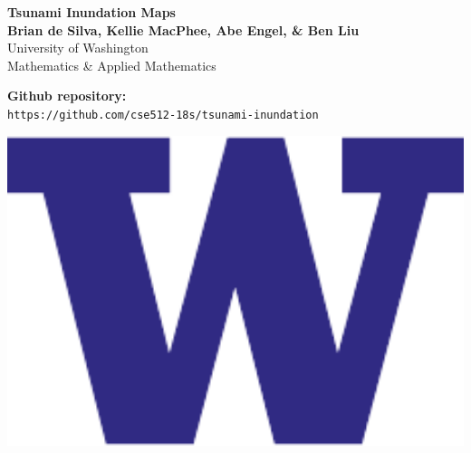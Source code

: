 \documentclass[a0,landscape]{a0poster}
\begin{document}


\begin{minipage}[b]{0.5\linewidth}
\raggedright
\veryHuge \color{MidnightBlue} \textbf{Tsunami Inundation Maps} \color{Black}\\ %
\huge \textbf{Brian de Silva, Kellie MacPhee, Abe Engel, \& Ben Liu}\\ %
\huge University of Washington\\ Mathematics \& Applied Mathematics\\ %
\end{minipage}
%
\begin{minipage}[b]{0.35\linewidth}
\color{DarkRed}\Large \textbf{Github repository:}\\
\texttt{https://github.com/cse512-18s/tsunami-inundation}\\
\end{minipage}
%
\begin{minipage}[b]{0.15\linewidth}
\includegraphics[width=15cm]{figures/UW_logo.pdf} %
\end{minipage}
\vspace{1cm} %
\end{document}
